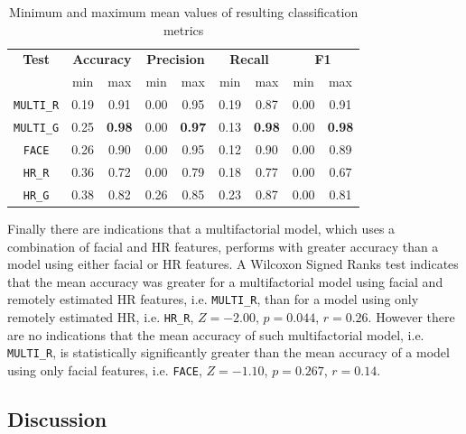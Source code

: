 \begin{table}[!htbp]
  \centering
  \caption{Minimum and maximum mean values of resulting classification metrics}
  \label{table:study5-result-metrics-minmax}
  \begin{tabular}{ccccccccc}
    \hline
      \textbf{Test} & \multicolumn{2}{c}{\textbf{Accuracy}} & \multicolumn{2}{c}{\textbf{Precision}} & \multicolumn{2}{c}{\textbf{Recall}} & \multicolumn{2}{c}{\textbf{F1}} \\
      {} & min & max & min & max & min & max & min & max \\
    \hline
      \texttt{MULTI\_R}  & 0.19 & 0.91 & 0.00 & 0.95 & 0.19 & 0.87 & 0.00 & 0.91 \\ %
      \texttt{MULTI\_G}  & 0.25 & \textbf{0.98} & 0.00 & \textbf{0.97} & 0.13 & \textbf{0.98} & 0.00 & \textbf{0.98} \\ %
      \texttt{FACE}  & 0.26 & 0.90 & 0.00 & 0.95 & 0.12 & 0.90 & 0.00 & 0.89 \\ %
      \texttt{HR\_R}  & 0.36 & 0.72 & 0.00 & 0.79 & 0.18 & 0.77 & 0.00 & 0.67 \\ %
      \texttt{HR\_G}  & 0.38 & 0.82 & 0.26 & 0.85 & 0.23 & 0.87 & 0.00 & 0.81 \\ %
    \hline
  \end{tabular}
\end{table}


Finally there are indications that a multifactorial model, which uses a combination of facial and HR features, performs with greater accuracy than a model using either facial or HR features. A Wilcoxon Signed Ranks test indicates that the mean accuracy was greater for a multifactorial model using facial and remotely estimated HR features, i.e. \texttt{MULTI\_R}, than for a model using only remotely estimated HR, i.e. \texttt{HR\_R}, $Z=-2.00$, $p=0.044$, $r=0.26$. However there are no indications that the mean accuracy of such multifactorial model, i.e. \texttt{MULTI\_R}, is statistically significantly greater than the mean accuracy of a model using only facial features, i.e. \texttt{FACE}, $Z=-1.10$, $p=0.267$, $r=0.14$.

\subsection{Discussion}

